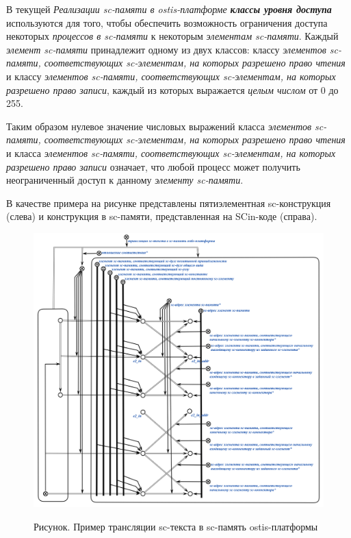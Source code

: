 В текущей \textit{Реализации sc-памяти в ostis-платформе} \textbf{\textit{классы уровня доступа\scnsupergroupsign}} используются для того, чтобы обеспечить возможность ограничения доступа некоторых \textit{процессов в sc-памяти} к некоторым \textit{элементам sc-памяти}. Каждый \textit{элемент sc-памяти} принадлежит одному из двух классов: классу \textit{элементов sc-памяти, соответствующих sc-элементам, на которых разрешено право чтения} и классу \textit{элементов sc-памяти, соответствующих sc-элементам, на которых разрешено право записи}, каждый из которых выражается \textit{целым числом} от 0 до 255.

Таким образом нулевое значение числовых выражений класса \textit{элементов sc-памяти, соответствующих sc-элементам, на которых разрешено право чтения} и класса \textit{элементов sc-памяти, соответствующих sc-элементам, на которых разрешено право записи} означает, что любой процесс может получить неограниченный доступ к данному \textit{элементу sc-памяти}.

В качестве примера на рисунке  представлены пятиэлементная sc-конструкция (слева) и конструкция в sc-памяти, представленная на SCin-коде (справа).

\begin{figure}[htbp]
	\center
	\caption{Рисунок. Пример трансляции sc-текста в sc-память ostis-платформы}
	\includegraphics[scale=0.65]{author/part6/figures/sc_code_in_memory_representation.png}
	\label{fig:sc_code_in_memory_representation}
\end{figure}

